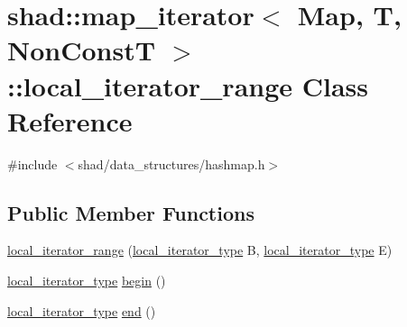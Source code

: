 \hypertarget{classshad_1_1map__iterator_1_1local__iterator__range}{\section{shad\-:\-:map\-\_\-iterator$<$ Map, T, Non\-Const\-T $>$\-:\-:local\-\_\-iterator\-\_\-range Class Reference}
\label{classshad_1_1map__iterator_1_1local__iterator__range}
}


{\ttfamily \#include $<$shad/data\-\_\-structures/hashmap.\-h$>$}

\subsection*{Public Member Functions}
\begin{DoxyCompactItemize}
\item 
\hyperlink{classshad_1_1map__iterator_1_1local__iterator__range_ad9d4505be8b0544129bfee90157b10b9}{local\-\_\-iterator\-\_\-range} (\hyperlink{classshad_1_1map__iterator_adceb72a3948aa860edd3a4c9ceca821d}{local\-\_\-iterator\-\_\-type} B, \hyperlink{classshad_1_1map__iterator_adceb72a3948aa860edd3a4c9ceca821d}{local\-\_\-iterator\-\_\-type} E)
\item 
\hyperlink{classshad_1_1map__iterator_adceb72a3948aa860edd3a4c9ceca821d}{local\-\_\-iterator\-\_\-type} \hyperlink{classshad_1_1map__iterator_1_1local__iterator__range_a96710212124486798b158bb6c6a2fd93}{begin} ()
\item 
\hyperlink{classshad_1_1map__iterator_adceb72a3948aa860edd3a4c9ceca821d}{local\-\_\-iterator\-\_\-type} \hyperlink{classshad_1_1map__iterator_1_1local__iterator__range_a94dde4eb827de492b6f3197134b8074d}{end} ()
\end{DoxyCompactItemize}


